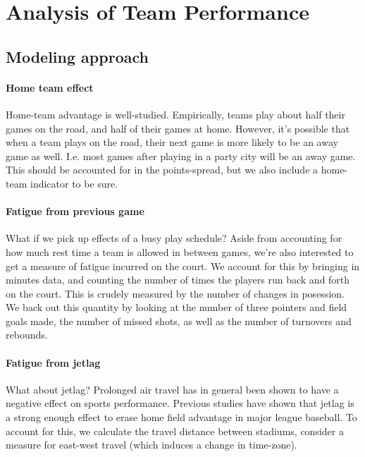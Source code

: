 \documentclass[letterpaper,12pt]{article}
\begin{document}
\section{Analysis of Team Performance}

\subsection{Modeling approach}

\paragraph{Home team effect}
Home-team advantage is well-studied.\citep{jones07, jones08}  
Empirically, teams play about half their games on the road, and half of their games at home. However,
it's possible that when a team plays on the road, their next game is more likely to be
an away game as well. I.e. most games after playing in a party city will be an away game.
This should be accounted for in the points-spread, but we also include
a home-team indicator to be sure.

\paragraph{Fatigue from previous game}
What if we pick up effects of a busy play schedule?
Aside from accounting for how much rest time a team is allowed in between games,
we're also interested to get a measure of
fatigue incurred on the court.
We account for this by bringing in minutes data, and counting the number of 
times the players run back and forth on the court. This is crudely measured
by the number of changes in posession. We back out this quantity by looking
at the number of three pointers and field goals made, the number of missed shots,
as well as the number of turnovers and rebounds.

\paragraph{Fatigue from jetlag}
What about jetlag? Prolonged air travel has in general been shown
to have a negative effect on sports performance.\citep{leeandgalvez}
Previous studies have shown that jetlag is a strong enough effect
to erase home field advantage in major league baseball.\citep{songetal}
To account for this, we calculate the travel distance between stadiums,
consider a measure for east-west travel (which induces a change in time-zone).
\end{document}
